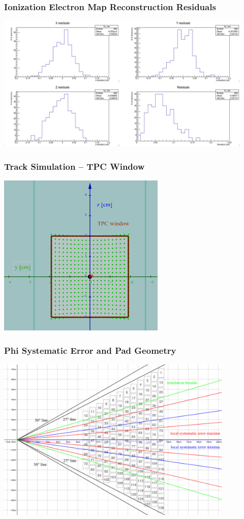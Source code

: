 \documentclass{beamer}
\begin{document}
	\begin{frame}[noframenumbering]
		\frametitle{Ionization Electron Map Reconstruction Residuals}
		\centering
		\includegraphics[width=0.92\textwidth]{../images/res_hists.png}
	\end{frame}
	\begin{frame}[noframenumbering]
		\frametitle{Track Simulation -- TPC Window}
		\centering
		\includegraphics[width=0.6\textwidth]{../images/tpc_window_sim.png}
	\end{frame}
	\begin{frame}[noframenumbering]
		\frametitle{Phi Systematic Error and Pad Geometry}
		\centering
		\includegraphics[width=0.85\textwidth]{../images/phi_systematic_error.png}
	\end{frame}
	
\end{document}
